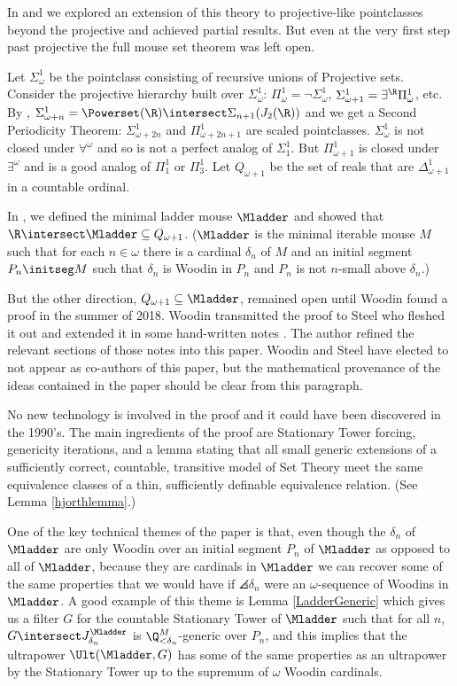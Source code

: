 \documentclass[oneside,12pt]{amsart}
\begin{document}
In \cite{My_Thesis} and \cite{Mouse_Sets} we explored an extension of this theory
to projective-like pointclasses beyond the projective and achieved partial results.
But even at the very first step past projective the full mouse set theorem was left open.

Let $\Sigma^1_{\omega}$
be the pointclass consisting of recursive unions of Projective sets. Consider
the projective hierarchy built over $\Sigma^1_{\omega}$:
$\Pi^1_{\omega} = \neg \Sigma^1_{\omega}$,
$\Sigma^1_{\omega+1} = \exists^{\R} \Pi^1_{\omega}$, etc.
By \cite{Scales_In_LofR}, $\Sigma^1_{\omega+n} = \Powerset(\R)\intersect \Sigma_{n+1}(J_2(\R))$
and we get a Second Periodicity Theorem: $\Sigma^1_{\omega+2n}$ and $\Pi^1_{\omega+2n+1}$ are scaled pointclasses.
$\Sigma^1_{\omega}$ is not closed under $\forall^{\omega}$ and so is not a perfect analog of $\Sigma^1_1$.
But $\Pi^1_{\omega+1}$ is closed under $\exists^{\omega}$ and is a good analog of $\Pi^1_1$ or $\Pi^1_3$.
Let $Q_{\omega+1}$ be the set of reals that are $\Delta^1_{\omega+1}$ in a countable ordinal.

In \cite{My_Thesis}, we defined the minimal ladder mouse $\Mladder$ and showed that
$\R\intersect\Mladder\subseteq Q_{\omega+1}$. ($\Mladder$ is the minimal iterable mouse $M$ such
that for each $n\in\omega$ there is a cardinal $\delta_n$ of $M$ and an initial segment $P_n \initseg M$
such that $\delta_n$ is Woodin in $P_n$ and $P_n$ is not $n$-small above $\delta_n$.)

But the other direction, $Q_{\omega+1} \subseteq \Mladder$, remained open until
Woodin found a proof in the summer of 2018. Woodin transmitted the proof to Steel who fleshed it out
and extended it in some hand-written notes \cite{Mouse_Pairs_and_Suslin_Cardinals}.
The author refined the relevant sections of those notes into this paper.
Woodin and Steel have elected to not appear as co-authors of this paper,
but the mathematical provenance of the ideas contained in the paper should be clear from this paragraph.

No new technology is involved in the proof and it could have been discovered in the 1990's. The main ingredients
of the proof are Stationary Tower forcing, genericity iterations, and a lemma stating that
all small generic extensions of a sufficiently correct, countable, transitive model of Set Theory
meet the same equivalence classes of a thin, sufficiently
definable equivalence
relation. (See Lemma \ref{hjorthlemma}.)

One of the key technical themes of the paper is that, even though
the $\delta_n$ of $\Mladder$ are only Woodin over an initial segment $P_n$
of $\Mladder$ as opposed to all of $\Mladder$, because they are
cardinals in $\Mladder$ we can recover some of the same properties
that we would have if $\angles{\delta_n}$ were an $\omega$-sequence
of Woodins in $\Mladder$. A good example of this theme is Lemma
\ref{LadderGeneric} which gives us a filter $G$ for the countable
Stationary Tower of $\Mladder$ such that for all $n$,
$G\intersect J^{\Mladder}_{\delta_n}$ is $\Q_{<\delta_n}^M$-generic over $P_n$, and this implies
that the ultrapower $\Ult(\Mladder, G)$ has some of the same properties as an
ultrapower by the Stationary Tower up to the supremum
of $\omega$ Woodin cardinals.
\end{document}

